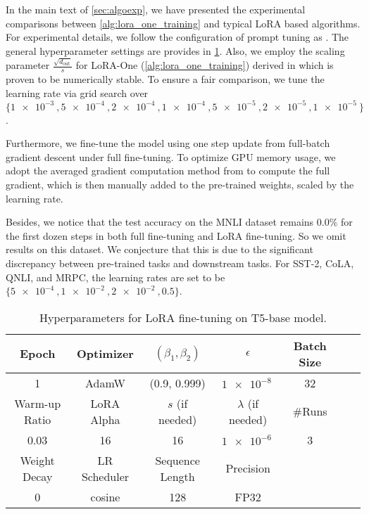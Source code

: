 In the main text of \cref{sec:algoexp}, we have presented the experimental comparisons between \cref{alg:lora_one_training} and typical LoRA based algorithms. 
For experimental details, we follow the configuration of prompt tuning as \cite{wang2024lora}. The general hyperparameter settings are provides in \cref{tab:nlu-general}. Also, we employ the scaling parameter $\frac{\sqrt{d_\text{out}}}{s}$ for LoRA-One (\cref{alg:lora_one_training}) derived in \cite{wang2024lora} which is proven to be numerically stable. To ensure a fair comparison, we tune the learning rate via grid search over $\{ \SI{1e-3}{} , \SI{5e-4}{} , \SI{2e-4}{} , \SI{1e-4}{} , \SI{5e-5}{} , \SI{2e-5}{} , \SI{1e-5}{} \}$.

Furthermore, we fine-tune the model using one step update from full-batch gradient descent under full fine-tuning. To optimize GPU memory usage, we adopt the averaged gradient computation method from \cite{lv2023full, wang2024lora} to compute the full gradient, which is then manually added to the pre-trained weights, scaled by the learning rate. 

Besides, we notice that the test accuracy on the MNLI dataset remains $0.0\%$ for the first dozen steps in both full fine-tuning and LoRA fine-tuning. So we omit results on this dataset.
We conjecture that this is due to the significant discrepancy between pre-trained tasks and downstream tasks. For SST-2, CoLA, QNLI, and MRPC, the learning rates are set to be $\{ \SI{5e-4}{} , \SI{1e-2}{} , \SI{2e-2}{} , \num{0.5} \}$.

\begin{table}[h]
    \centering
     \caption{Hyperparameters for LoRA fine-tuning on T5-base model.}
    \label{tab:nlu-general}
    \begin{tabular}{ccccccc}
        \toprule
        Epoch & Optimizer & $(\beta_1, \beta_2)$ & $\epsilon$ & Batch Size \\
        \midrule
        1 & AdamW & (0.9, 0.999) & $\SI{1e-8}{}$ & 32 \\
        \midrule
        Warm-up Ratio & LoRA Alpha & $s$ (if needed) & $\lambda$ (if needed) & \#Runs \\
        \midrule
        0.03 & 16 & 16 & $\SI{1e-6}{}$ & 3 \\
        \midrule
        Weight Decay & LR Scheduler  & Sequence Length & Precision & \\
        \midrule
        0 & cosine & 128 & FP32 & \\
        \bottomrule
    \end{tabular}
\end{table}

